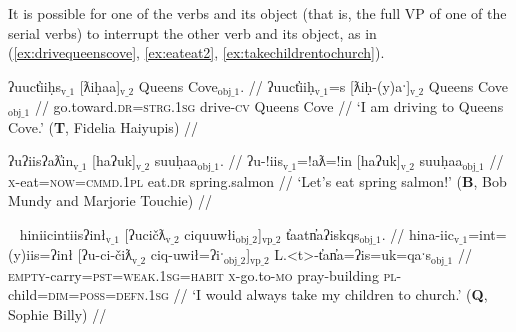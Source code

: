 It is possible for one of the verbs and its object (that is, the full VP of one of the serial verbs) to interrupt the other verb and its object, as in (\ref{ex:drivequeenscove}, \ref{ex:eateat2}, \ref{ex:takechildrentochurch}).

\ex \label{ex:drivequeenscove}
\begingl
\glpreamble ʔuuct̓iiḥs$_{\text{v\_1}}$ [ƛiḥaa]$_{\text{v\_2}}$ Queens Cove$_{\text{obj\_1}}$. //
\gla ʔuuct̓iiḥ$_{\text{v\_1}}$=s [ƛiḥ-(y)aˑ]$_{\text{v\_2}}$ Queens Cove$_{\text{obj\_1}}$ //
\glb go.toward.\textsc{dr}=\textsc{strg.1sg} drive-\textsc{cv} Queens Cove //
\glft `I am driving to Queens Cove.' (\textbf{T}, Fidelia Haiyupis) //
\endgl
\xe

\ex \label{ex:eateat2}
\begingl
\glpreamble ʔuʔiisʔaƛ̓in$_{\text{v\_1}}$ [haʔuk]$_{\text{v\_2}}$ suuḥaa$_{\text{obj\_1}}$. //
\gla ʔu-!iis$_{\text{v\_1}}$=!aƛ=!in [haʔuk]$_{\text{v\_2}}$ suuḥaa$_{\text{obj\_1}}$ //
\glb \textsc{x}-eat=\textsc{now}=\textsc{cmmd.1pl} eat.\textsc{dr} spring.salmon //
\glft `Let's eat spring salmon!' (\textbf{B}, Bob Mundy and Marjorie Touchie) //
\endgl
\xe

\ex~ \label{ex:takechildrentochurch}
\begingl
\glpreamble hiniicintiisʔinł$_{\text{v\_1}}$ [ʔucičƛ$_{\text{v\_2}}$ ciquuwłi$_{\text{obj\_2}}$]$_{\text{vp\_2}}$ t̓aatn̓aʔiskqs$_{\text{obj\_1}}$. //
\gla hina-iic$_{\text{v\_1}}$=int=(y)iis=ʔinł [ʔu-ci-čiƛ$_{\text{v\_2}}$ ciq-uwił=ʔiˑ$_{\text{obj\_2}}$]$_{\text{vp\_2}}$ L.<t>-t̓an̓a=ʔis=uk=qaˑs$_{\text{obj\_1}}$  //
\glb \textsc{empty}-carry=\textsc{pst}=\textsc{weak.1sg}=\textsc{habit} \textsc{x}-go.to-\textsc{mo} pray-building \textsc{pl}-child=\textsc{dim}=\textsc{poss}=\textsc{defn.1sg} //
\glft `I would always take my children to church.' (\textbf{Q}, Sophie Billy) //
\endgl
\xe



